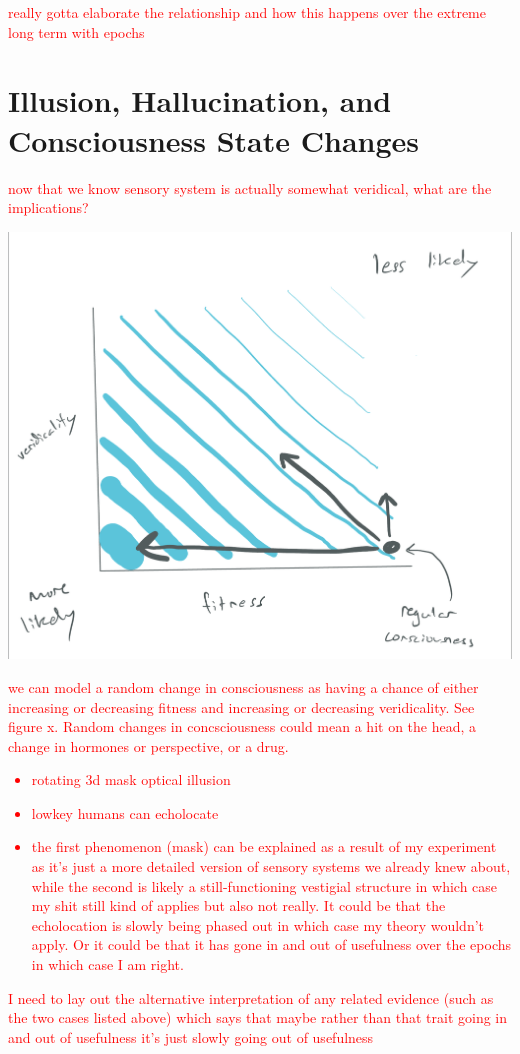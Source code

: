 \documentclass{article}[10pt]
\begin{document}
\textcolor{red}{really gotta elaborate the relationship and how this happens over the extreme long term with epochs}

\section{Illusion, Hallucination, and Consciousness State Changes}

\textcolor{red}{now that we know sensory system is actually somewhat veridical, what are the implications?}

\includegraphics[scale = 0.2]{IMG_D69D74B327B2-1.jpeg}

\textcolor{red}{we can model a random change in consciousness as having a chance of either increasing or decreasing fitness and increasing or decreasing veridicality. See figure x. Random changes in concsciousness could mean a hit on the head, a change in hormones or perspective, or a drug.}

\textcolor{red}{\begin{itemize}
    \item rotating 3d mask optical illusion
    \item lowkey humans can echolocate
    \item the first phenomenon (mask) can be explained as a result of my experiment as it's just a more detailed version of sensory systems we already knew about, while the second is likely a still-functioning vestigial structure in which case my shit still kind of applies but also not really. It could be that the echolocation is slowly being phased out in which case my theory wouldn't apply. Or it could be that it has gone in and out of usefulness over the epochs in which case I am right.
\end{itemize}}

\textcolor{red}{I need to lay out the alternative interpretation of any related evidence (such as the two cases listed above) which says that maybe rather than that trait going in and out of usefulness it's just slowly going out of usefulness}


 

\end{document}
